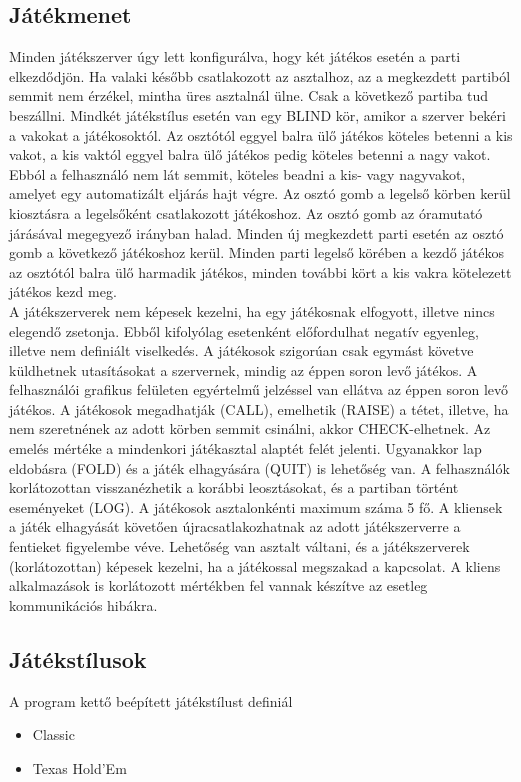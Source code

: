 \subsection{Játékmenet}
Minden játékszerver úgy lett konfigurálva, hogy két játékos esetén a parti elkezdődjön. Ha valaki később csatlakozott az asztalhoz, az a megkezdett partiból semmit nem érzékel, mintha üres asztalnál ülne. Csak a következő partiba tud beszállni. Mindkét játékstílus esetén van egy BLIND kör, amikor a szerver bekéri a vakokat a játékosoktól. Az osztótól eggyel balra ülő játékos köteles betenni a kis vakot, a kis vaktól eggyel balra ülő játékos pedig köteles betenni a nagy vakot. Ebból a felhasználó nem lát semmit, köteles beadni a kis- vagy nagyvakot, amelyet egy automatizált eljárás hajt végre. Az osztó gomb  a legelső körben kerül kiosztásra a legelsőként csatlakozott játékoshoz. Az osztó gomb az óramutató járásával megegyező irányban halad. Minden új megkezdett parti esetén az osztó gomb a következő játékoshoz kerül. Minden parti legelső körében a kezdő játékos az osztótól balra ülő harmadik játékos, minden további kört a kis vakra kötelezett játékos kezd meg.  \\
A játékszerverek nem képesek kezelni, ha egy játékosnak elfogyott, illetve nincs elegendő zsetonja. Ebből kifolyólag esetenként előfordulhat negatív egyenleg, illetve nem definiált viselkedés. A játékosok szigorúan csak egymást követve küldhetnek utasításokat a szervernek, mindig az éppen soron levő játékos. A felhasználói grafikus felületen egyértelmű jelzéssel van ellátva az éppen soron levő játékos. A játékosok megadhatják (CALL), emelhetik (RAISE) a tétet, illetve, ha nem szeretnének az adott körben semmit csinálni, akkor CHECK-elhetnek. Az emelés mértéke a mindenkori játékasztal alaptét felét jelenti. Ugyanakkor lap eldobásra (FOLD) és a játék elhagyására (QUIT) is lehetőség van. A felhasználók korlátozottan visszanézhetik a korábbi leosztásokat, és a partiban történt eseményeket (LOG). A játékosok asztalonkénti maximum száma 5 fő. A kliensek a játék elhagyását követően újracsatlakozhatnak az adott játékszerverre a fentieket figyelembe véve. Lehetőség van asztalt váltani, és a játékszerverek (korlátozottan) képesek kezelni, ha a játékossal megszakad a kapcsolat. A kliens alkalmazások is korlátozott mértékben fel vannak készítve az esetleg kommunikációs hibákra.

\subsection{Játékstílusok} \label{subsubsec:game_styles}
A program kettő beépített játékstílust definiál
\begin{itemize}[leftmargin=2cm]
\item Classic \cite{five_card_draw}
\item Texas Hold'Em \cite{texas_holdem}
\end{itemize}

